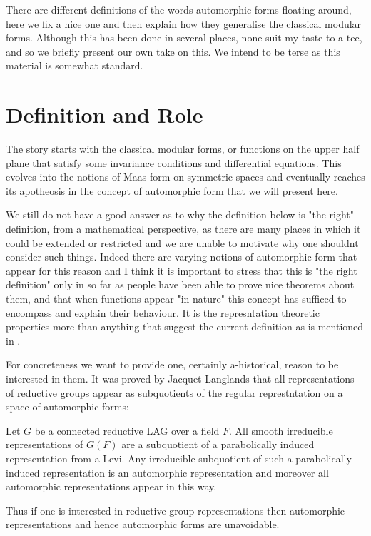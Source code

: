 There are different definitions of the words automorphic forms floating around, here we fix a nice one and then explain how they generalise the classical modular forms. Although this has been done in several places, none suit my taste to a tee, and so we briefly present our own take on this. We intend to be terse as this material is somewhat standard.

\section{Definition and Role}
The story starts with the classical modular forms, or functions on the upper half plane that satisfy some invariance conditions and differential equations. This evolves into the notions of Maas form on symmetric spaces and eventually reaches its apotheosis in the concept of automorphic form that we will present here. 

We still do not have a good answer as to why the definition below is "the right" definition, from a mathematical perspective, as there are many places in which it could be extended or restricted and we are unable to motivate why one shouldnt consider such things. Indeed there are varying notions of automorphic form that appear for this reason and I think it is important to stress that this is "the right definition" only in so far as people have been able to prove nice theorems about them, and that when functions appear "in nature" this concept has sufficed to encompass and explain their behaviour. It is the represntation theoretic properties more than anything that suggest the current definition as is mentioned in \cite[1.II.3]{borelAutomorphicFormsRepresentations1979}.

For concreteness we want to provide one, certainly a-historical, reason to be interested in them. It was proved by Jacquet-Langlands that all representations of reductive groups appear as subquotients of the regular represtntation on a space of automorphic forms:

\begin{Theorem}
    Let \(G\) be a connected reductive LAG over a field \(F\).
    All smooth irreducible representations of \(G(F)\) are a subquotient of a parabolically induced representation from a Levi. Any irreducible subquotient of such a parabolically induced representation is an automorphic representation and moreover all automorphic representations appear in this way. 
\end{Theorem}
Thus if one is interested in reductive group representations then automorphic representations and hence automorphic forms are unavoidable.

